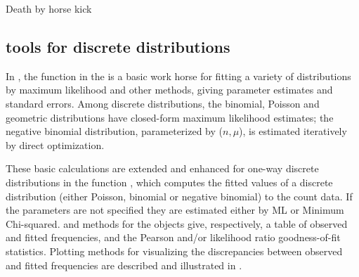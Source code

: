 \documentclass[10pt,krantz2]{krantz}\usepackage[]{graphicx}\usepackage[]{color}
\begin{document}
\begin{Example}[horsekick2]{Death by horse kick}
\end{Example}

\subsection[R tools for discrete distributions]{\R tools for discrete distributions}\label{sec:fitdistr}
In \R, the function  in the 
is a basic work horse for fitting a variety of distributions
by maximum likelihood and other methods, giving parameter estimates
and standard errors.
Among discrete distributions, the binomial,
Poisson and geometric distributions have closed-form
maximum likelihood estimates; the negative binomial distribution,
parameterized by ($n, \mu$), is estimated iteratively by direct
optimization.

These basic calculations are extended and enhanced for one-way
discrete distributions in the  function
, which
computes the fitted values of a discrete distribution (either Poisson, binomial or negative binomial) to the count data.
If the parameters are not specified they are estimated either by ML or Minimum Chi-squared.  and  methods for
the  objects give, respectively, a table of
observed and fitted frequencies, and the Pearson and/or likelihood
ratio goodness-of-fit statistics. Plotting methods for visualizing
the discrepancies between observed and fitted frequencies are
described and illustrated in .
\end{document}
